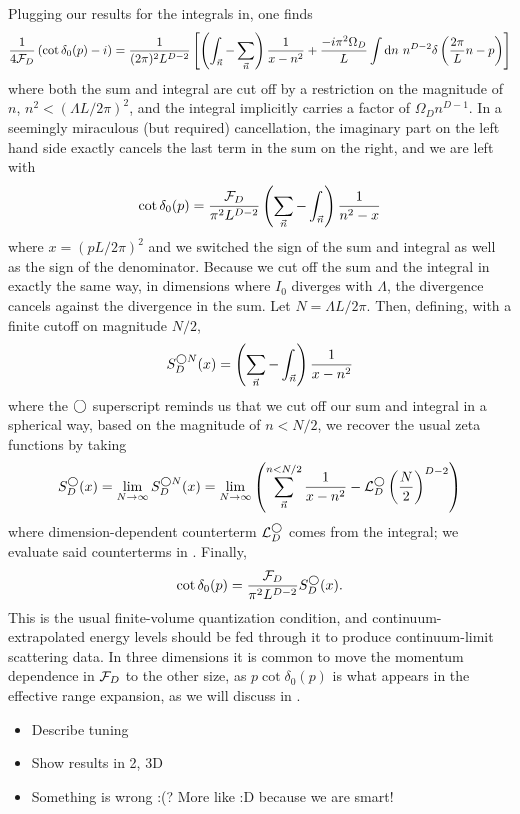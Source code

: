 Plugging our results for the integrals in, one finds
\begin{equation}
    \frac{1}{4\mathcal{F}_D}\left(\cot \delta_0(p) - i\right) = \frac{1}{(2\pi)^2 L^{D-2}}\left[ \left(\int_{\vec{n}} - \sum_{\vec{n}}\right) \frac{1}{x-n^2} + \frac{-i \pi^2\Omega_D}{L} \int \mathrm{d}n\ n^{D-2} \delta\left(\frac{2\pi}{L}n - p\right) \right]
\end{equation}
where both the sum and integral are cut off by a restriction on the magnitude of $n$, $n^2 < (\Lambda L / 2\pi)^2$, and the integral implicitly carries a factor of $\Omega_D n^{D-1}$.
In a seemingly miraculous (but required) cancellation, the imaginary part on the left hand side exactly cancels the last term in the sum on the right, and we are left with
\begin{equation}
    \cot \delta_0(p) = \frac{\mathcal{F}_D}{\pi^2 L^{D-2}} \left(\sum_{\vec{n}}-\int_{\vec{n}}\right) \frac{1}{n^2-x}
\end{equation}
where $x=(pL/2\pi)^2$ and we switched the sign of the sum and integral as well as the sign of the denominator.
Because we cut off the sum and the integral in exactly the same way, in dimensions where $I_0$ diverges with $\Lambda$, the divergence cancels against the divergence in the sum.
Let $N=\Lambda L/2\pi$.
Then, defining, with a finite cutoff on magnitude $N/2$,
\begin{equation}\label{eq:spherical cutoff S}
    S^{\bigcirc N}_D(x) = \left(\sum_{\vec{n}}- \int_{\vec{n}}\right) \frac{1}{x-n^2}
\end{equation}
where the $\bigcirc$ superscript reminds us that we cut off our sum and integral in a spherical way, based on the magnitude of $n<N/2$, we recover the usual \Luscher zeta functions by taking
\begin{equation}\label{eq:spherical S}
    S^\bigcirc_D(x)
    =
    \lim_{N\rightarrow\infty} S^{\bigcirc N}_D(x)
    =
    \lim_{N\rightarrow\infty}\left( \sum_{\vec{n}}^{n < N/2} \frac{1}{x-n^2} - \mathcal{L}_D^\bigcirc \left(\frac{N}{2}\right)^{D-2}\right)
\end{equation}
where dimension-dependent counterterm $\mathcal{L}_D^\bigcirc$ comes from the integral; we evaluate said counterterms in .
Finally,
\begin{equation}\label{eq:spherical quantization}
    \cot \delta_0(p) = \frac{\mathcal{F}_D}{\pi^2 L^{D-2}} S^\bigcirc_D(x).
\end{equation}
This is the usual \Luscher finite-volume quantization condition, and continuum-extrapolated energy levels should be fed through it to produce continuum-limit scattering data.
In three dimensions it is common to move the momentum dependence in $\mathcal{F}_D$ to the other size, as $p \cot\delta_0(p)$ is what appears in the effective range expansion, as we will discuss in .

\begin{itemize}
    \item Describe tuning
    \item Show results in 2, 3D
    \item Something is wrong :(?  More like :D because we are smart!
\end{itemize}
